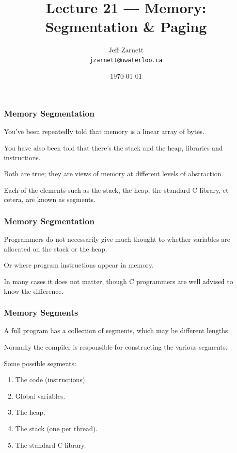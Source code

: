 

\title{Lecture 21 --- Memory: Segmentation \& Paging }

\author{Jeff Zarnett \\ \small \texttt{jzarnett@uwaterloo.ca}}
\date{\today}




\begin{frame}
  \titlepage

 \end{frame}



\begin{frame}
\frametitle{Memory Segmentation}

You've been repeatedly told that memory is a linear array of bytes. 

You have also been told that there's the stack and the heap, libraries and instructions.

Both are true; they are views of memory at different levels of abstraction. 

Each of the elements such as the stack, the heap, the standard C library, et cetera, are known as \alert{segments}.


\end{frame}

\begin{frame}
\frametitle{Memory Segmentation}

Programmers do not necessarily give much thought to whether variables are allocated on the stack or the heap.

Or where program instructions appear in memory. 

In many cases it does not matter, though C programmers are well advised to know the difference.


\end{frame}

\begin{frame}
\frametitle{Memory Segments}

A full program has a collection of segments, which may be different lengths. 

Normally the compiler is responsible for constructing the various segments.

Some possible segments:

\begin{enumerate}
	\item The code (instructions).
	\item Global variables.
	\item The heap.
	\item The stack (one per thread).
	\item The standard C library.
\end{enumerate}

\end{frame}

